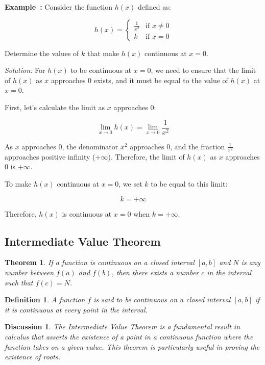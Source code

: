 \documentclass[a4paper,12pt]{book}
\newenvironment{solution}[1][]
{\par\noindent\textit{Solution:} \rmfamily}{\medskip}
\newcounter{example}
\newenvironment{example}[1][\theexample]
  {\refstepcounter{example}\par\medskip\noindent\textbf{Example~#1:} \rmfamily}
  {\medskip}
\newtheorem{theorem}{Theorem}
\newtheorem{definition}{Definition}
\newtheorem{discussion}{Discussion}
\begin{document}
\begin{example}
Consider the function \(h(x)\) defined as:

\[
h(x) =
\begin{cases}
  \frac{1}{x^2} & \text{if } x \neq 0 \\
  k & \text{if } x = 0
\end{cases}
\]

Determine the values of \(k\) that make \(h(x)\) continuous at \(x = 0\).
\end{example}

\begin{solution}
For \(h(x)\) to be continuous at \(x = 0\), we need to ensure that the limit of \(h(x)\) as \(x\) approaches 0 exists, and it must be equal to the value of \(h(x)\) at \(x = 0\).

First, let's calculate the limit as \(x\) approaches 0:

\[
\lim_{{x \to 0}} h(x) = \lim_{{x \to 0}} \frac{1}{x^2}
\]

As \(x\) approaches 0, the denominator \(x^2\) approaches 0, and the fraction \(\frac{1}{x^2}\) approaches positive infinity (\(+\infty\)). Therefore, the limit of \(h(x)\) as \(x\) approaches 0 is \(+\infty\).

To make \(h(x)\) continuous at \(x = 0\), we set \(k\) to be equal to this limit:

\[
k = +\infty
\]

Therefore, \(h(x)\) is continuous at \(x = 0\) when \(k = +\infty\).
\end{solution}

\subsection{Intermediate Value Theorem}

\begin{theorem}
If a function is continuous on a closed interval \([a, b]\) and \( N \) is any number between \( f(a) \) and \( f(b) \), then there exists a number \( c \) in the interval such that \( f(c) = N \).
\end{theorem}

\begin{definition}
A function \( f \) is said to be continuous on a closed interval \([a, b]\) if it is continuous at every point in the interval.
\end{definition}

\begin{discussion}
The Intermediate Value Theorem is a fundamental result in calculus that asserts the existence of a point in a continuous function where the function takes on a given value. This theorem is particularly useful in proving the existence of roots.
\end{discussion}
\end{document}

